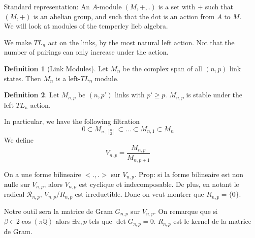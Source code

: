 \documentclass[a4paper]{book}
\theoremstyle{definition}
\newtheorem{definition}{Definition}[section]
\theoremstyle{remark}
\begin{document}
Standard representation: An $A$-module $(M,+,.)$ is a set with $+$ such that $(M,+)$ is an abelian group, and such that the dot is an action from $A$ to $M$. We will look at modules of the temperley lieb algebra. 

We make $TL_n$ act on the links, by the most natural left action. Not that the number of pairings can only increase under the action. 

\begin{definition}[Link Modules]
    Let $M_n$ be the complex span of all $(n,p)$ link states. Then $M_n$ is a left-$TL_n$ module. 
\end{definition}
\begin{definition}
    Let $M_{n,p}$ be $(n,p')$ links with $p'\geq p$. $M_{n,p}$ is stable under the left $TL_n$ action. 
\end{definition}
In particular, we have the following filtration 
\begin{equation}
    0 \subset M_{n, [\frac{n}{2}]} \subset \dots \subset M_{n,1} \subset M_n
\end{equation}
We define 
\begin{equation}
    V_{n,p} = \frac{M_{n,p}}{M_{n,p+1}}
\end{equation}

On a une forme bilineaire $<.,.>$ sur $V_{n,p}$. Prop: si la forme bilineaire est non nulle sur $V_{n,p}$, alors $V_{n,p}$ est cyclique et indecomposable. De plus, en notant le radical $\mathcal R_{n,p}$, $V_{n,p}/R_{n,p}$ est irreductible. Donc on veut montrer que $R_{n,p} = \{0\}$. \par \medskip 

Notre outil sera la matrice de Gram $G_{n,p}$ sur $V_{n,p}$. On remarque que si $\beta \in 2\cos (\pi \mathbb{Q})$ alors $\exists n,p$ tels que $\det G_{n,p} = 0$. $R_{n,p}$ est le kernel de la matrice de Gram. 
\end{document}

